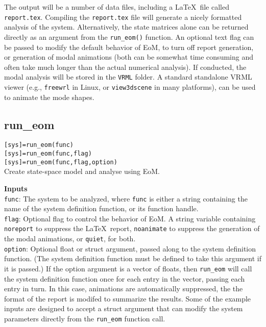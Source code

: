 The output will be a number of data files, including a \LaTeX\ file called \texttt{report.tex}.  Compiling the \texttt{report.tex} file will generate a nicely formatted analysis of the system.  Alternatively, the state matrices alone can be returned directly as an argument from the \texttt{run\_eom()} function.  An optional text flag can be passed to modify the default behavior of EoM, to turn off report generation, or generation of modal animations (both can be somewhat time consuming and often take much longer than the actual numerical analysis).  If conducted, the modal analysis will be stored in the \texttt{VRML} folder.  A standard standalone VRML viewer (e.g., \texttt{freewrl} in Linux, or \texttt{view3dscene} in many platforms), can be used to animate the mode shapes.

\subsection{run\_eom}

\texttt{[sys]=run\_eom(func)} \\

\noindent \texttt{[sys]=run\_eom(func,flag)}\\

\noindent \texttt{[sys]=run\_eom(func,flag,option)}\\

\noindent Create state-space model and analyse using EoM.

\noindent \textbf{Inputs}\\
\texttt{func}: The system to be analyzed, where \texttt{func} is either a string containing the name of the system definition function, or its function handle.\\
\texttt{flag}: Optional flag to control the behavior of EoM.  A string variable containing \texttt{noreport} to suppress the \LaTeX\ report, \texttt{noanimate} to suppress the generation of the modal animations, or \texttt{quiet}, for both.\\
\texttt{option}: Optional float or struct argument, passed along to the system definition function.  (The system definition function must be defined to take this argument if it is passed.)  If the option argument is a vector of floats, then \texttt{run\_eom} will call the system definition function once for each entry in the vector, passing each entry in turn.  In this case, animations are automatically suppressed, the the format of the report is modifed to summarize the results.  Some of the example inputs are designed to accept a struct argument that can modify the system parameters directly from the \texttt{run\_eom} function call.

